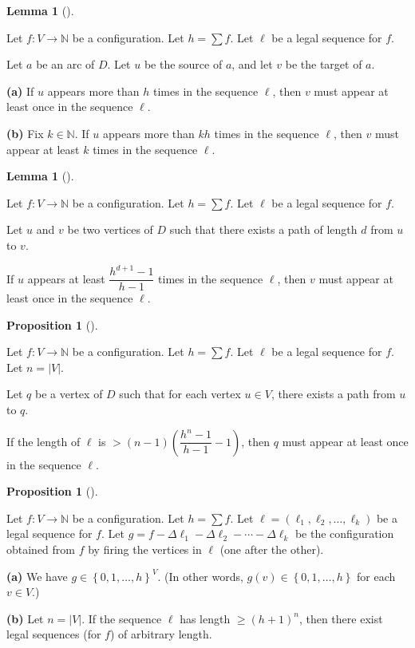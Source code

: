 \documentclass[numbers=enddot,12pt,final,onecolumn,notitlepage]{scrartcl}%
\theoremstyle{definition}
\newtheorem{lem}[theo]{Lemma}
\newenvironment{lemma}[1][]
{\begin{lem}[#1]\begin{leftbar}}
{\end{leftbar}\end{lem}}
\newtheorem{prop}[theo]{Proposition}
\newenvironment{proposition}[1][]
{\begin{prop}[#1]\begin{leftbar}}
{\end{leftbar}\end{prop}}
\let\sumnonlimits\sum
\renewcommand{\sum}{\sumnonlimits\limits}
\newcommand{\NN}{\mathbb{N}}
\newcommand{\set}[1]{\left\{ #1 \right\}}
\newcommand{\abs}[1]{\left| #1 \right|}
\newcommand{\tup}[1]{\left( #1 \right)}
\begin{document}
\begin{lemma} \label{lem.chip.leg-bound1}
Let $f : V \to \NN$ be a configuration.
Let $h = \sum f$.
Let $\ell$ be a legal sequence for $f$.

Let $a$ be an arc of $D$.
Let $u$ be the source of $a$, and let $v$ be the target of $a$.

\textbf{(a)}
If $u$ appears more than $h$ times in the sequence $\ell$,
then $v$ must appear at least once in the sequence $\ell$.

\textbf{(b)}
Fix $k \in \NN$.
If $u$ appears more than $kh$ times in the sequence $\ell$,
then $v$ must appear at least $k$ times in the sequence $\ell$.
\end{lemma}

\begin{lemma} \label{lem.chip.leg-bound1b}
Let $f : V \to \NN$ be a configuration.
Let $h = \sum f$.
Let $\ell$ be a legal sequence for $f$.

Let $u$ and $v$ be two vertices of $D$ such that there exists
a path of length $d$ from $u$ to $v$.

If $u$ appears at least $\dfrac{h^{d+1}-1}{h-1}$
times in the sequence $\ell$,
then $v$ must appear at least once in the sequence $\ell$.
\end{lemma}

\begin{proposition} \label{prop.chip.leg-everyone-fires}
Let $f : V \to \NN$ be a configuration.
Let $h = \sum f$.
Let $\ell$ be a legal sequence for $f$.
Let $n = \abs{V}$.

Let $q$ be a vertex of $D$ such that for each vertex
$u \in V$, there exists a path from $u$ to $q$.

If the length of $\ell$ is
$> \tup{n-1} \tup{ \dfrac{h^n-1}{h-1} - 1 }$,
then $q$ must appear at least once in the sequence $\ell$.
\end{proposition}

\begin{proposition} \label{prop.chip.leg-period}
Let $f : V \to \NN$ be a configuration.
Let $h = \sum f$.
Let $\ell = \tup{\ell_1, \ell_2, \ldots, \ell_k}$ be a
legal sequence for $f$.
Let
$g = f - \Delta \ell_1 - \Delta \ell_2 - \cdots - \Delta \ell_k$
be the configuration obtained from $f$ by firing the vertices in
$\ell$ (one after the other).

\textbf{(a)} We have $g \in \set{0, 1, \ldots, h}^V$.
(In other words, $g \tup{v} \in \set{0, 1, \ldots, h}$
for each $v \in V$.)

\textbf{(b)} Let $n = \abs{V}$.
If the sequence $\ell$ has length
$\geq \tup{h+1}^n$, then there exist legal sequences (for $f$)
of arbitrary length.
\end{proposition}
\end{document}
